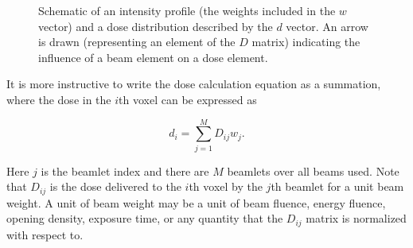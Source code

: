 \begin{figure}[H]
    \centering
    \caption{Schematic of an intensity profile (the weights included in the $w$ vector) and a dose distribution described by the $d$ vector. An arrow is drawn (representing an element of the $D$ matrix) indicating the influence of a beam element on a dose element.}
    \label{fig: 5}
\end{figure}

It is more instructive to write the dose calculation equation as a summation, where the dose in the $i$th voxel can be expressed as

\begin{equation}
    d_i = \sum_{j=1}^{M} D_{ij} w_j .
    \label{1}
\end{equation}

Here $j$ is the beamlet index and there are $M$ beamlets over all beams used. Note that $D_{ij}$ is the dose delivered to the $i$th voxel by the $j$th beamlet for a unit beam weight. A unit of beam weight may be a unit of beam fluence, energy fluence, opening density, exposure time, or any quantity that the $D_{ij}$ matrix is normalized with respect to.


